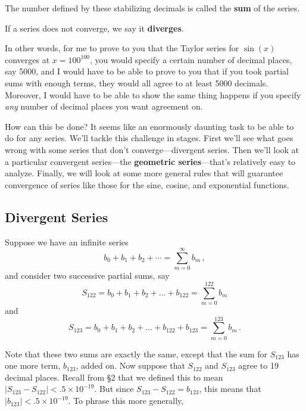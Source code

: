 {{{{\begin{center}
{{    \medskip
    The number defined by these stabilizing decimals is called the {\bf sum} of the series.
    
    \medskip
    If a series does not  converge, we say it {\bf diverges}.
    \vspace{4pt} 
    }
   }
\end{center}
\medskip




In other words, for me to prove to you that the Taylor series for $\sin(x)$  
converges at $x=100^{100}$, you would specify a certain number of decimal places, say 5000, and I would
 have to be able to prove to you that if you took partial sums with enough terms, they would all agree to at least 5000 decimals.  Moreover, I would have to be able to show the same thing happens if you specify {\em any} number of decimal places you want agreement on.

How can this be done?  It seems like an enormously daunting task to be able to do for any series.  We'll tackle this challenge in stages.  First we'll see what goes wrong with some series that don't converge---divergent series.  Then we'll look at a particular convergent series---the {\bf geometric series}---that's relatively easy to analyze.  Finally, we will look at some more general rules that will guarantee convergence of series like those for the sine, cosine, and exponential functions.










\subsection{Divergent Series}

Suppose we have an infinite series
\[
b_0 + b_1 + b_2 + \cdots = \sum_{m=0}^\infty b_m \, ,
\] 
and consider two successive partial sums, say
\[
S_{122}=b_0 + b_1 + b_2 + \ldots+b_{122}=\sum_{m=0}^{122} b_m
\]
and
\[
S_{123}=b_0 + b_1 + b_2 + \ldots+b_{122}+b_{123}=\sum_{m=0}^{123} b_m \, .
\]

Note that these two sums are exactly the same, except that the sum for
$S_{123}$ has one more term, $b_{123}$, added on.  Now suppose that
$S_{122}$ and $S_{123}$ agree to 19 decimal places.  Recall from \S 2
that we defined this to
mean $|S_{123}-S_{122}|<.5 \times 10^{-19}$.  But since
$S_{123}-S_{122}=b_{123}$, this means that $|b_{123}|<.5 \times 10^{-19}$.  To phrase this more generally,

}}}}

